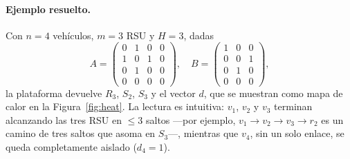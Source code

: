 \documentclass[smartcities,article,submit,oneauthor]{Definitions/mdpi}
\begin{document}
\paragraph{Ejemplo resuelto.} Con $n=4$ vehículos, $m=3$ RSU y $H=3$, dadas
\[
A=\left(\begin{smallmatrix}0&1&0&0\\1&0&1&0\\0&1&0&0\\0&0&0&0\end{smallmatrix}\right),\quad
B=\left(\begin{smallmatrix}1&0&0\\0&0&1\\0&1&0\\0&0&0\end{smallmatrix}\right),
\]
la plataforma devuelve $R_3$, $S_2$, $S_3$ y el vector $d$, que se muestran como mapa
de calor en la Figura~\ref{fig:heat}. La lectura es intuitiva: $v_1$, $v_2$ y $v_3$
terminan alcanzando las tres RSU en $\le 3$ saltos ---por ejemplo,
$v_1\!\to\!v_2\!\to\!v_3\!\to\!r_2$ es un camino de tres saltos que asoma en $S_3$---,
mientras que $v_4$, sin un solo enlace, se queda completamente aislado ($d_4=1$).
\end{document}
